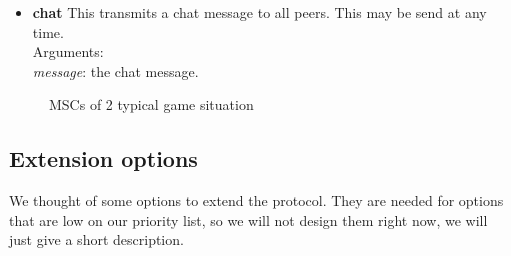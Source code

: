 \documentclass[a4paper,twoside,11pt]{article}
\begin{document}
\begin{itemize}
\begin{itemize}
      \item \textbf{chat}
This transmits a chat message to all peers. This may be send at any time. \\
Arguments: \\
\textit{message}: the chat message. \\

    \end{itemize}
\end{itemize}

\begin{figure}[!ht]
  \centering
  \caption{MSCs of 2 typical game situation} \label{fig:MSCs}
\end{figure}


\subsection{Extension options}
We thought of some options to extend the protocol. They are needed for options that are low on our priority list, so we will not design them right now, we will just give a short description.
\end{document}
